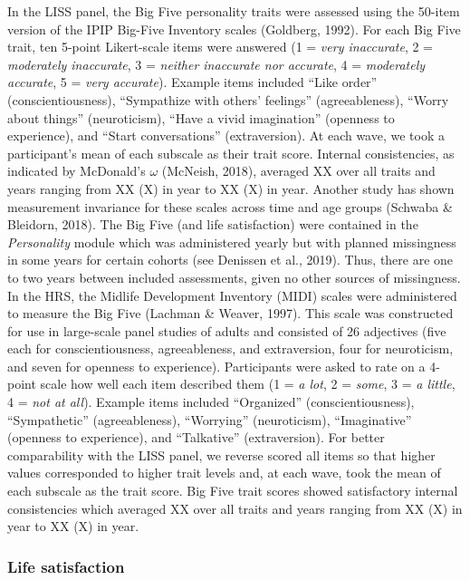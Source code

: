 \documentclass[
  english,
  man, noextraspace]{apa7}
\begin{document}
In the LISS panel, the Big Five personality traits were assessed using the 50-item version of the IPIP Big-Five Inventory scales (Goldberg, 1992). For each Big Five trait, ten 5-point Likert-scale items were answered (1 = \emph{very inaccurate}, 2 = \emph{moderately inaccurate}, 3 = \emph{neither inaccurate nor accurate}, 4 = \emph{moderately accurate}, 5 = \emph{very accurate}). Example items included \enquote{Like order} (conscientiousness), \enquote{Sympathize with others' feelings} (agreeableness), \enquote{Worry about things} (neuroticism), \enquote{Have a vivid imagination} (openness to experience), and \enquote{Start conversations} (extraversion). At each wave, we took a participant's mean of each subscale as their trait score. Internal consistencies, as indicated by McDonald's \(\omega\) (McNeish, 2018), averaged XX over all traits and years ranging from XX (X) in year to XX (X) in year. Another study has shown measurement invariance for these scales across time and age groups (Schwaba \& Bleidorn, 2018). The Big Five (and life satisfaction) were contained in the \emph{Personality} module which was administered yearly but with planned missingness in some years for certain cohorts (see Denissen et al., 2019). Thus, there are one to two years between included assessments, given no other sources of missingness.\\
In the HRS, the Midlife Development Inventory (MIDI) scales were administered to measure the Big Five (Lachman \& Weaver, 1997). This scale was constructed for use in large-scale panel studies of adults and consisted of 26 adjectives (five each for conscientiousness, agreeableness, and extraversion, four for neuroticism, and seven for openness to experience). Participants were asked to rate on a 4-point scale how well each item described them (1 = \emph{a lot}, 2 = \emph{some}, 3 = \emph{a little}, 4 = \emph{not at all}). Example items included \enquote{Organized} (conscientiousness), \enquote{Sympathetic} (agreeableness), \enquote{Worrying} (neuroticism), \enquote{Imaginative} (openness to experience), and \enquote{Talkative} (extraversion). For better comparability with the LISS panel, we reverse scored all items so that higher values corresponded to higher trait levels and, at each wave, took the mean of each subscale as the trait score. Big Five trait scores showed satisfactory internal consistencies which averaged XX over all traits and years ranging from XX (X) in year to XX (X) in year.

\hypertarget{life-satisfaction}{%
\subsubsection{Life satisfaction}\label{life-satisfaction}}
\end{document}
